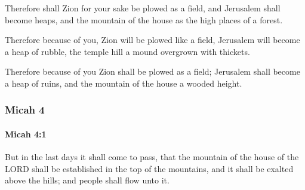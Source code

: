 			\begin{versebox}
					\item[BHS] 
					\item[LXX] 
					\item[ASV] Therefore shall Zion for your sake be plowed as a field, and Jerusalem shall become heaps, and the mountain of the house as the high places of a forest.
					\item[NIV] Therefore because of you, Zion will be plowed like a field, Jerusalem will become a heap of rubble, the temple hill a mound overgrown with thickets.
					\item[NRSV] Therefore because of you Zion shall be plowed as a field; Jerusalem shall become a heap of ruins, and the mountain of the house a wooded height.
			\end{versebox}
	\subsubsection{Micah 4} %
		\label{MICAH-4}

		\paragraph{Micah 4:1} %
			\label{MICAH-4-1}

			But in the last days it shall come to pass, that the mountain of the house of the LORD shall be established in the top of the mountains, and it shall be exalted above the hills; and people shall flow unto it.

